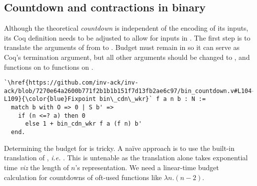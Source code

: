 \subsection{Countdown and contractions in binary}

\renewcommand{\Tleb}{\runtime_{\li{N.leb}}}
\renewcommand{\Tsucc}{\runtime_{\li{N.succ}}}

Although the theoretical \emph{countdown} is independent of the encoding
of its inputs, its Coq definition needs to be adjusted to allow for inputs
in . The first step is to translate the arguments of
 from  to . Budget  must
remain in  so it can serve as Coq's termination argument,
but all other  arguments should be changed
to , and functions on  to functions on .
\begin{lstlisting}
`\href{https://github.com/inv-ack/inv-ack/blob/7270e64a2600b771f2b1b1b151f7d13fb2ae6c97/bin_countdown.v#L104-L109}{\color{blue}Fixpoint bin\_cdn\_wkr}` f a n b : N :=
  match b with O => 0 | S b' =>
    if (n <=? a) then 0
      else 1 + bin_cdn_wkr f a (f n) b'
  end.
\end{lstlisting}

Determining the budget for  is tricky.
A naïve approach is to use the built-in  translation of ,
\emph{i.e.} . This is untenable as the translation alone
takes exponential time \emph{viz} the length of $n$'s representation.
We need a linear-time budget calculation for countdowns
of oft-used functions like $\lambda n.(n-2)$.

